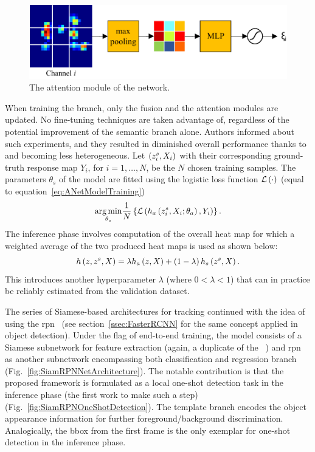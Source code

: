 \begin{figure}[t]
    \centerline{\includegraphics[width=0.6\linewidth]{figures/theoretical_foundations/twofold_siamese_net_attention_module.pdf}}
    \caption[ attention module]{The attention module of the  network. }
    \label{fig:TwofoldSiameseNetAttentionModule}
\end{figure}

When training the  branch, only the fusion and the attention modules are updated. No fine-tuning techniques are taken advantage of, regardless of the potential improvement of the semantic branch alone. Authors informed about such experiments, and they resulted in diminished overall performance thanks to  and  becoming less heterogeneous. Let $\left( {{z}_{i}^{s}, X_i} \right)$ with their corresponding ground-truth response map $Y_i$, for $i = 1, \dots, N$, be the $N$ chosen training samples. The parameters $\theta_s$ of the  model are fitted using the logistic loss function ${\mathcal{L}} \left( \cdot \right)$ (equal to equation~\ref{eq:ANetModelTraining})
\begin{equation}
    \label{eq:SNetModelTraining}
    \underset{\theta_s}{\operatorname*{arg\,min}}
    \frac{1}{N}
    \left\{ {
        {\mathcal{L}} \left( 
            {h_a} \left( {z}_{i}^{s}, X_i; \theta_a \right),
            Y_i
         \right)
    } \right\}.
\end{equation}
The inference phase involves computation of the overall heat map for which a weighted average of the two produced heat maps is used as shown below:
\begin{equation}
    {h} \left( z, z^s, X \right) = \lambda {h_a} \left( z, X \right) + \left( {1 - \lambda} \right) {h_s} \left( z^s, X \right).
\end{equation}
This introduces another hyperparameter $\lambda$ (where $0 < \lambda < 1$) that can in practice be reliably estimated from the validation dataset.

The series of Siamese-based architectures for tracking continued with the idea of using the \gls{rpn}~\cite{Li2018} (see section~\ref{ssec:FasterRCNN} for the same concept applied in object detection). Under the flag of end-to-end training, the  model consists of a Siamese subnetwork for feature extraction (again, a duplicate of the ~\cite{Bertinetto2016}) and \gls{rpn} as another subnetwork encompassing both classification and regression branch (Fig.~\ref{fig:SiamRPNNetArchitecture}). The notable contribution is that the proposed framework is formulated as a local one-shot detection task in the inference phase (the first work to make such a step) (Fig.~\ref{fig:SiamRPNOneShotDetection}). The template branch encodes the object appearance information for further foreground/background discrimination. Analogically, the \gls{bbox} from the first frame is the only exemplar for one-shot detection in the inference phase.

